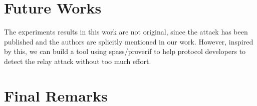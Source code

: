 \documentclass{article}
\begin{document}
\section{Future Works}
	The experiments results in this work are not original, since the attack
	has been published and the authors are splicitly mentioned in our work.
	However, inspired by this, we can build a tool using spass/proverif to
	help protocol developers to detect the relay attack without too much
	effort.

\section{Final Remarks}
\end{document}
